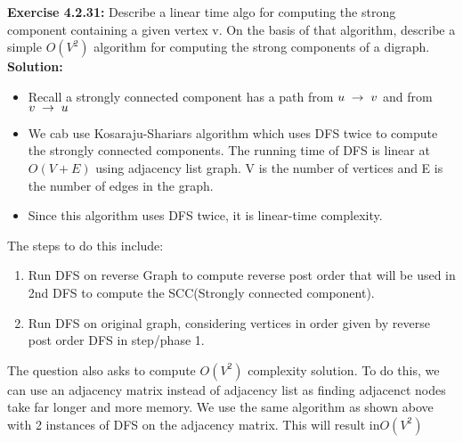 \documentclass[11pt,fleqn]{article}
\newcommand{\be}{\begin{enumerate}}
\newcommand{\ee}{\end{enumerate}}
\begin{document}
\textbf{Exercise 4.2.31:} Describe a linear time algo for computing the strong component containing a given vertex v. On the basis of that algorithm, describe a simple $O(V^2)$ algorithm for computing the strong components of a digraph.\\

\textbf{Solution:}
\begin{itemize}
	\item Recall a strongly connected component has a path from $u \thickspace \rightarrow \thickspace v$ and from $v \thickspace \rightarrow \thickspace u$
	
	\item We cab use Kosaraju-Shariars algorithm which uses DFS twice to compute the strongly connected components. The running time of DFS is linear at $O(V + E)$ using adjacency list graph. V is the number of vertices and E is the number of edges in the graph.
	
	\item Since this algorithm uses DFS twice, it is linear-time complexity.
\end{itemize}

The steps to do this include:\\
\be
	\item Run DFS on reverse Graph to compute reverse post order that will be used in 2nd DFS to compute the SCC(Strongly connected component).
	\item Run DFS on original graph, considering vertices in order given by reverse post order DFS in step/phase 1.
\ee

The question also asks to compute $O(V^2)$ complexity solution. To do this, we can use an adjacency matrix instead of adjacency list as finding adjacenct nodes take far longer and more memory. We use the same algorithm as shown above with 2 instances of DFS on the adjacency matrix. This will result in$O(V^2)$\\
\end{document}
